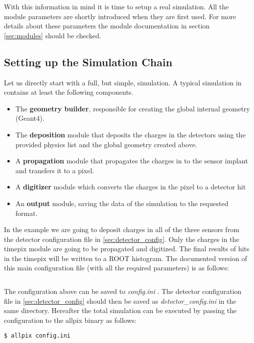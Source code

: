 With this information in mind it is time to setup a real simulation. All the module parameters are shortly introduced when they are first used. For more details about these parameters the module documentation in section \ref{sec:modules} should be checked.

\subsection{Setting up the Simulation Chain}
Let us directly start with a full, but simple, simulation. A typical simulation in \apsq contains at least the following components.
\begin{itemize}
\item The \textbf{geometry builder}, responsible for creating the global internal geometry (Geant4).
\item The \textbf{deposition} module that deposits the charges in the detectors using the provided physics list and the global geometry created above.
\item A \textbf{propagation} module that propagates the charges in to the sensor implant and transfers it to a pixel.
\item A \textbf{digitizer} module which converts the charges in the pixel to a detector hit
\item An \textbf{output} module, saving the data of the simulation to the requested format.
\end{itemize}

In the example we are going to deposit charges in all of the three sensors from the detector configuration file in \ref{sec:detector_config}. Only the charges in the timepix module are going to be propagated and digitized. The final results of hits in the timepix will be written to a ROOT histogram. The documented version of this main configuration file (with all the required parameters) is as follows:
\inputminted[frame=single,framesep=3pt,breaklines=true,tabsize=2,linenos]{ini}{../../etc/manual.conf}

The configuration above can be saved to \textit{config.ini} . The detector configuration file in \ref{sec:detector_config} should then be saved as \textit{detector\_config.ini} in the same directory. Hereafter the total simulation can be executed by passing the configuration to the allpix binary as follows:

\begin{verbatim}
$ allpix config.ini
\end{verbatim}

